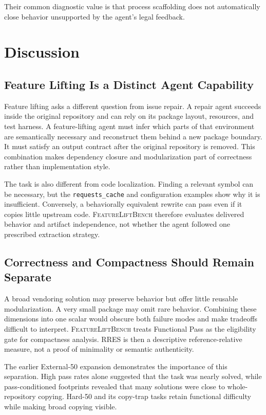 \documentclass[acmsmall,anonymous,review,screen]{acmart}
\newcommand{\flb}{\textsc{FeatureLiftBench}\xspace}
\newcommand{\rres}{\textsc{RRES}\xspace}
\begin{document}
Their common diagnostic value is that process scaffolding does not
automatically close behavior unsupported by the agent's legal feedback.

\section{Discussion}
\label{sec:discussion}

\subsection{Feature Lifting Is a Distinct Agent Capability}

Feature lifting asks a different question from issue repair. A repair agent
succeeds inside the original repository and can rely on its package layout,
resources, and test harness. A feature-lifting agent must infer which parts of
that environment are semantically necessary and reconstruct them behind a new
package boundary. It must satisfy an output contract after the original
repository is removed. This combination makes dependency closure and
modularization part of correctness rather than implementation style.

The task is also different from code localization. Finding a relevant symbol
can be necessary, but the \texttt{requests\_cache} and configuration examples
show why it is insufficient. Conversely, a behaviorally equivalent rewrite can
pass even if it copies little upstream code. \flb therefore evaluates delivered
behavior and artifact independence, not whether the agent followed one
prescribed extraction strategy.

\subsection{Correctness and Compactness Should Remain Separate}

A broad vendoring solution may preserve behavior but offer little reusable
modularization. A very small package may omit rare behavior. Combining these
dimensions into one scalar would obscure both failure modes and make tradeoffs
difficult to interpret. \flb treats Functional Pass as the eligibility gate
for compactness analysis. \rres is then a descriptive reference-relative
measure, not a proof of minimality or semantic authenticity.

The earlier External-50 expansion demonstrates the importance of this
separation. High pass rates alone suggested that the task was nearly solved,
while pass-conditioned footprints revealed that many solutions were close to
whole-repository copying. Hard-50 and its copy-trap tasks retain functional
difficulty while making broad copying visible.
\end{document}
